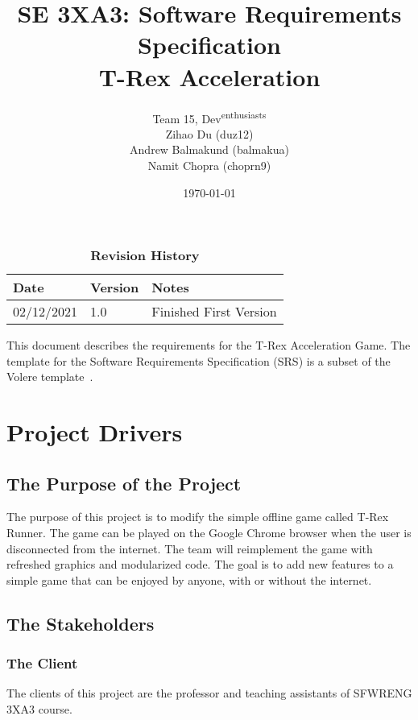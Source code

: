 \documentclass[12pt, titlepage]{article}
\title{SE 3XA3: Software Requirements Specification\\T-Rex Acceleration}
\author{Team 15, Dev\textsuperscript{enthusiasts}
		\\ Zihao Du (duz12)
		\\ Andrew Balmakund (balmakua) 
		\\ Namit Chopra (choprn9)
}
\date{\today}
\begin{document}
\maketitle

\tableofcontents
\listoftables
\listoffigures

\begin{table}[bp]
\caption{\bf Revision History}
\begin{tabularx}{\textwidth}{p{3cm}p{2cm}X}
\toprule {\bf Date} & {\bf Version} & {\bf Notes}\\
\midrule
02/12/2021 & 1.0 & Finished First Version\\
\bottomrule
\end{tabularx}
\end{table}

\newpage


This document describes the requirements for the T-Rex Acceleration Game. The template for the Software
Requirements Specification (SRS) is a subset of the Volere template~\citep{RobertsonAndRobertson2012}. 

\section{Project Drivers}

\subsection{The Purpose of the Project}
The purpose of this project is to modify the simple offline game called T-Rex Runner. The game can be played on the Google Chrome browser when the user is disconnected from the internet. The team will reimplement the game with refreshed graphics and modularized code. The goal is to add new features to a simple game that can be enjoyed by anyone, with or without the internet. 

\subsection{The Stakeholders}

\subsubsection{The Client}
The clients of this project are the professor and teaching assistants of SFWRENG 3XA3 course.
\end{document}
